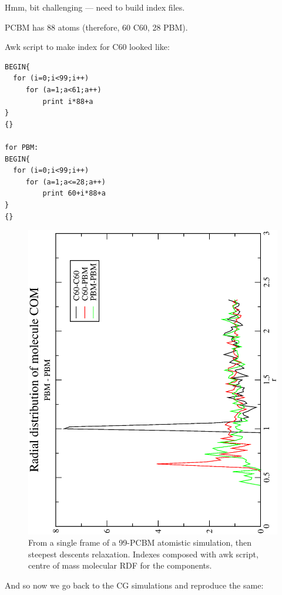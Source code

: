 \documentclass[hyperref]{labbook}
\begin{document}

Hmm, bit challenging --- need to build index files.

PCBM has 88 atoms (therefore, 60 C60, 28 PBM).

Awk script to make index for C60 looked like:
\begin{verbatim}
BEGIN{
  for (i=0;i<99;i++)
     for (a=1;a<61;a++)
         print i*88+a
}
{}

for PBM:
BEGIN{
  for (i=0;i<99;i++)
     for (a=1;a<=28;a++)
         print 60+i*88+a
}
{}
\end{verbatim}

\begin{figure}[h!]
\centering
\includegraphics[width=0.8\columnwidth,angle=270]{./figs/atomistic_mono_cg_rdfs}
\caption{\label{atomistic_mono_cg_rdfs}
From a single frame of a 99-PCBM atomistic simulation, then steepest descents relaxation. Indexes composed with awk script, centre of mass molecular RDF for the components.
}
\end{figure}

And so now we go back to the CG simulations and reproduce the same:
\end{document}
